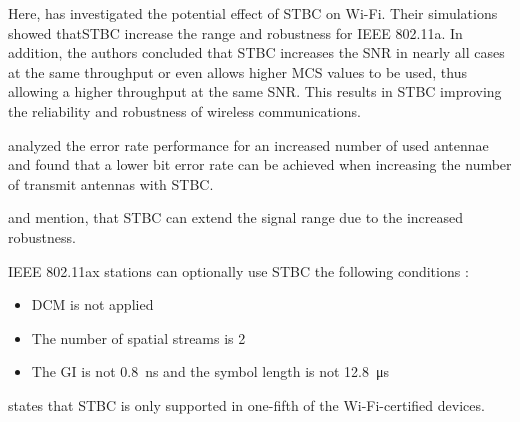 Here, \textcite{stamoulis_impact_2003} has investigated the potential effect of \ac{STBC} on Wi-Fi.
Their simulations showed that\ac{STBC} increase the range and robustness for IEEE 802.11a.
In addition, the authors concluded that \ac{STBC} increases the \ac{SNR} in nearly all cases at the same throughput or
even allows higher \ac{MCS} values to be used,
thus allowing a higher throughput at the same \ac{SNR}.
This results in \ac{STBC} improving the reliability and robustness of wireless communications.

\textcite{ghosh_error_2014} analyzed the error rate performance for an increased number of used antennae and found
that a lower bit error rate can be achieved
when increasing the number of transmit antennas with \ac{STBC}.

\textcite{gast_80211n_2012} and \textcite{sauter_wireless_2022} mention, that \ac{STBC} can extend the signal range
due to the increased robustness.


IEEE 802.11ax stations can optionally use \ac{STBC} the following conditions \cite{noauthor_ieee_2021}:
\begin{itemize}
	\item DCM is not applied
	\item The number of spatial streams is \num{2}
	\item The \ac{GI} is not \SI{0.8}{\nano\second} and the symbol length is not \SI{12.8}{\micro\second}
\end{itemize}

\cite{gast_80211n_2012} states that \ac{STBC} is only supported in one-fifth of the Wi-Fi-certified devices.

